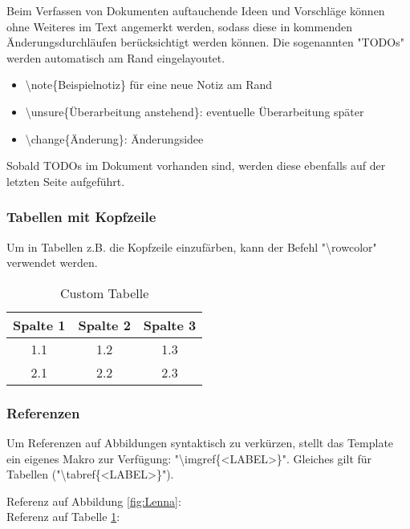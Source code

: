 Beim Verfassen von Dokumenten auftauchende Ideen und Vorschläge können ohne Weiteres
im Text angemerkt werden, sodass diese in kommenden Änderungsdurchläufen berücksichtigt werden können.
Die sogenannten "TODOs" werden automatisch am Rand eingelayoutet.

\begin{itemize}
  \item {}\textbackslash{}note\{Beispielnotiz\} für eine neue Notiz am Rand
  \item {}\textbackslash{}unsure\{Überarbeitung anstehend\}: eventuelle Überarbeitung später
  \item {}\textbackslash{}change\{Änderung\}: Änderungsidee
\end{itemize}

Sobald TODOs im Dokument vorhanden sind, werden diese ebenfalls auf der letzten Seite aufgeführt.

\subsubsection{Tabellen mit Kopfzeile}

Um in Tabellen z.B. die Kopfzeile einzufärben, kann der Befehl "\textbackslash{}rowcolor" verwendet werden.

\begin{table}[H]
  \centering

  \begin{tabular}{|c|c|c|}
    \hline
    \rowcolor{gray!30}
    Spalte 1 & Spalte 2 & Spalte 3 \\
    \hline
    1.1 & 1.2 & 1.3 \\
    2.1 & 2.2 & 2.3 \\
    \hline
  \end{tabular}

  \caption{Custom Tabelle}
  \label{tab:Tabelle 2}
\end{table}

\subsubsection{Referenzen}

Um Referenzen auf Abbildungen syntaktisch zu verkürzen, stellt das Template
ein eigenes Makro zur Verfügung: "\textbackslash{}imgref\{<LABEL>\}". Gleiches gilt
für Tabellen ("\textbackslash{}tabref\{<LABEL>\}").

Referenz auf Abbildung \ref{fig:Lenna}: \\
Referenz auf Tabelle \ref{tab:Tabelle 2}: 